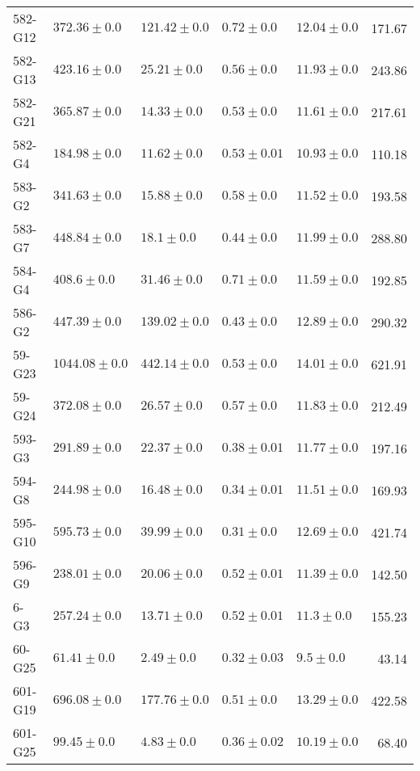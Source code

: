 \begin{tabular}{lllllr}
    582-G12 &     $372.36 \pm 0.0$ &      $121.42 \pm 0.0$ &   $0.72 \pm 0.0$ &  $12.04 \pm 0.0$ &    171.67 \\
    582-G13 &     $423.16 \pm 0.0$ &       $25.21 \pm 0.0$ &   $0.56 \pm 0.0$ &  $11.93 \pm 0.0$ &    243.86 \\
    582-G21 &     $365.87 \pm 0.0$ &       $14.33 \pm 0.0$ &   $0.53 \pm 0.0$ &  $11.61 \pm 0.0$ &    217.61 \\
     582-G4 &     $184.98 \pm 0.0$ &       $11.62 \pm 0.0$ &  $0.53 \pm 0.01$ &  $10.93 \pm 0.0$ &    110.18 \\
     583-G2 &     $341.63 \pm 0.0$ &       $15.88 \pm 0.0$ &   $0.58 \pm 0.0$ &  $11.52 \pm 0.0$ &    193.58 \\
     583-G7 &     $448.84 \pm 0.0$ &        $18.1 \pm 0.0$ &   $0.44 \pm 0.0$ &  $11.99 \pm 0.0$ &    288.80 \\
     584-G4 &      $408.6 \pm 0.0$ &       $31.46 \pm 0.0$ &   $0.71 \pm 0.0$ &  $11.59 \pm 0.0$ &    192.85 \\
     586-G2 &     $447.39 \pm 0.0$ &      $139.02 \pm 0.0$ &   $0.43 \pm 0.0$ &  $12.89 \pm 0.0$ &    290.32 \\
     59-G23 &    $1044.08 \pm 0.0$ &      $442.14 \pm 0.0$ &   $0.53 \pm 0.0$ &  $14.01 \pm 0.0$ &    621.91 \\
     59-G24 &     $372.08 \pm 0.0$ &       $26.57 \pm 0.0$ &   $0.57 \pm 0.0$ &  $11.83 \pm 0.0$ &    212.49 \\
     593-G3 &     $291.89 \pm 0.0$ &       $22.37 \pm 0.0$ &  $0.38 \pm 0.01$ &  $11.77 \pm 0.0$ &    197.16 \\
     594-G8 &     $244.98 \pm 0.0$ &       $16.48 \pm 0.0$ &  $0.34 \pm 0.01$ &  $11.51 \pm 0.0$ &    169.93 \\
    595-G10 &     $595.73 \pm 0.0$ &       $39.99 \pm 0.0$ &   $0.31 \pm 0.0$ &  $12.69 \pm 0.0$ &    421.74 \\
     596-G9 &     $238.01 \pm 0.0$ &       $20.06 \pm 0.0$ &  $0.52 \pm 0.01$ &  $11.39 \pm 0.0$ &    142.50 \\
       6-G3 &     $257.24 \pm 0.0$ &       $13.71 \pm 0.0$ &  $0.52 \pm 0.01$ &   $11.3 \pm 0.0$ &    155.23 \\
     60-G25 &      $61.41 \pm 0.0$ &        $2.49 \pm 0.0$ &  $0.32 \pm 0.03$ &    $9.5 \pm 0.0$ &     43.14 \\
    601-G19 &     $696.08 \pm 0.0$ &      $177.76 \pm 0.0$ &   $0.51 \pm 0.0$ &  $13.29 \pm 0.0$ &    422.58 \\
    601-G25 &      $99.45 \pm 0.0$ &        $4.83 \pm 0.0$ &  $0.36 \pm 0.02$ &  $10.19 \pm 0.0$ &     68.40 \\

\end{tabular}
